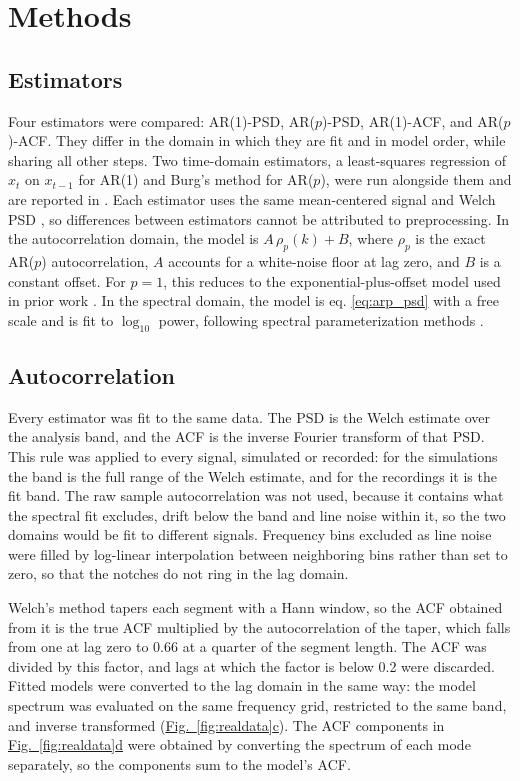 \documentclass[pdflatex,sn-mathphys-num]{sn-jnl}
\newcommand{\figpanel}[2]{\hyperref[#1]{Fig.~\ref*{#1}#2}}
\begin{document}
\section{Methods}\label{sec:methods}

\subsection{Estimators}

Four estimators were compared: AR(1)-PSD, AR($p$)-PSD, AR(1)-ACF, and AR($p$)-ACF. They differ in the domain in which they are fit and in model order, while sharing all other steps. Two time-domain estimators, a least-squares regression of $x_t$ on $x_{t-1}$ for AR(1) and Burg's method \cite{burg_maximum_1975} for AR($p$), were run alongside them and are reported in . Each estimator uses the same mean-centered signal and Welch PSD \cite{welch_use_1967}, so differences between estimators cannot be attributed to preprocessing. In the autocorrelation domain, the model is $A\,\rho_p(k) + B$, where $\rho_p$ is the exact AR($p$) autocorrelation, $A$ accounts for a white-noise floor at lag zero, and $B$ is a constant offset. For $p=1$, this reduces to the exponential-plus-offset model used in prior work \cite{murray_hierarchy_2014}. In the spectral domain, the model is eq. \ref{eq:arp_psd} with a free scale and is fit to $\log_{10}$ power, following spectral parameterization methods \cite{donoghue_parameterizing_2020}.

\subsection{Autocorrelation}

Every estimator was fit to the same data. The PSD is the Welch estimate over the analysis band, and the ACF is the inverse Fourier transform of that PSD. This rule was applied to every signal, simulated or recorded: for the simulations the band is the full range of the Welch estimate, and for the recordings it is the fit band. The raw sample autocorrelation was not used, because it contains what the spectral fit excludes, drift below the band and line noise within it, so the two domains would be fit to different signals. Frequency bins excluded as line noise were filled by log-linear interpolation between neighboring bins rather than set to zero, so that the notches do not ring in the lag domain.

Welch's method tapers each segment with a Hann window, so the ACF obtained from it is the true ACF multiplied by the autocorrelation of the taper, which falls from one at lag zero to 0.66 at a quarter of the segment length. The ACF was divided by this factor, and lags at which the factor is below 0.2 were discarded. Fitted models were converted to the lag domain in the same way: the model spectrum was evaluated on the same frequency grid, restricted to the same band, and inverse transformed (\figpanel{fig:realdata}{c}). The ACF components in \figpanel{fig:realdata}{d} were obtained by converting the spectrum of each mode separately, so the components sum to the model's ACF.
\end{document}

